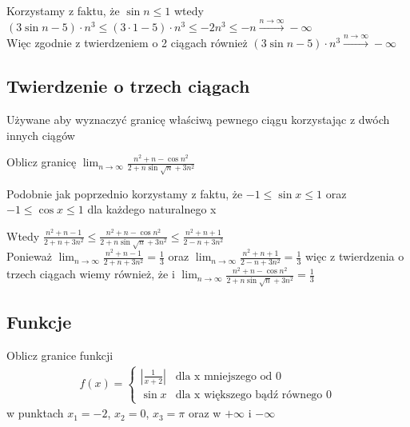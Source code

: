 \documentclass[main.tex]{subfiles}
\begin{document}
    \noindent Korzystamy z faktu, że $\sin{n} \leq 1$ wtedy \\
    $(3 \sin{n} - 5) \cdot n^{3}  \leq  (3\cdot 1 - 5) \cdot n^{3}  \leq  -2n^{3}  \leq  -n \stackrel{n \to \infty}{\longrightarrow} -\infty$ \\
    Więc zgodnie z twierdzeniem o 2 ciągach również $(3 \sin{n} - 5) \cdot n^{3} \stackrel{n \to \infty}{\longrightarrow} -\infty$

    \subsection{Twierdzenie o trzech ciągach}

    Używane aby wyznaczyć granicę właściwą pewnego ciągu korzystając z dwóch innych ciągów

    \begin{exercise}
        Oblicz granicę $\lim_{n\to \infty}{\frac{n^2+n-\cos{n^2}}{2+n\sin{\sqrt{n}}+3n^2}}$
    \end{exercise}

    \noindent Podobnie jak poprzednio korzystamy z faktu, że $-1 \leq \sin{x} \leq 1$ oraz $-1 \leq \cos{x} \leq 1$ dla każdego naturalnego x

    \noindent Wtedy $\frac{n^2+n-1}{2+n+3n^2} \leq \frac{n^2+n- \cos{n^2}}{2+n \sin{\sqrt{n}}+3n^2} \leq \frac{n^2+n+1}{2-n+3n^2}$ \\

    \noindent Ponieważ $\lim_{n\to \infty} \frac{n^2+n-1}{2+n+3n^2} = \frac{1}{3}$ oraz $\lim_{n\to \infty} \frac{n^2+n+1}{2-n+3n^2} = \frac{1}{3}$
    więc z twierdzenia o trzech ciągach wiemy również, że i $\lim_{n\to \infty}{\frac{n^2+n-\cos{n^2}}{2+n\sin{\sqrt{n}}+3n^2}} = \frac{1}{3}$


    \subsection{Funkcje}

    \begin{exercise}
        Oblicz granice funkcji
        \begin{align*}
            f(x) =
            \begin{cases}
                |\frac{1}{x+2}| & \text{dla x mniejszego od 0} \\
                \sin{x} & \text{dla x większego bądź równego 0}
            \end{cases}
        \end{align*}
        w punktach $x_{1} = -2$, $x_{2} = 0$, $x_{3} = \pi$ oraz w $+\infty$ i $-\infty$
    \end{exercise}
\end{document}
